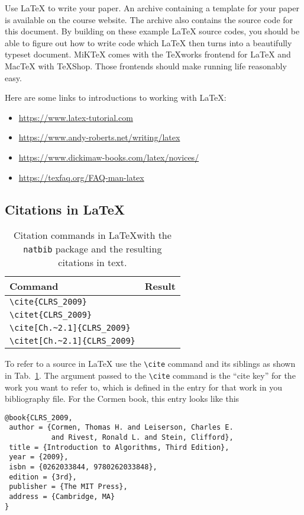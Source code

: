 \documentclass[sigconf, nonacm, natbib, screen, balance=False]{acmart}
\begin{document}
Use \LaTeX{} to write your paper. An archive containing a template for
your paper is available on the course website. The archive also
contains the source code for this document. By building on these example
\LaTeX{} source codes, you should be able to figure out how to write
code which \LaTeX{} then turns into a beautifully typeset document.
MiKTeX comes with the TeXworks frontend for LaTeX and MacTeX with
TeXShop. Those frontends should make running life reasonably easy.

Here are some links to introductions to working with \LaTeX{}:
\begin{itemize}
  \item \url{https://www.latex-tutorial.com}
\item \url{https://www.andy-roberts.net/writing/latex}
\item \url{https://www.dickimaw-books.com/latex/novices/}
\item \url{https://texfaq.org/FAQ-man-latex}
\end{itemize}


\subsection{Citations in \LaTeX}

\begin{table}
  \begin{tabular}{ll}
    \hline
    Command & Result \\\hline
    \verb!\cite{CLRS_2009}! & \cite{CLRS_2009} \\
    \verb!\citet{CLRS_2009}! & \citet{CLRS_2009} \\
    \verb!\cite[Ch.~2.1]{CLRS_2009}! & \cite[Ch.~2.1]{CLRS_2009} \\
    \verb!\citet[Ch.~2.1]{CLRS_2009}! & \citet[Ch.~2.1]{CLRS_2009} \\\hline
    \end{tabular}
  \caption{Citation commands in \LaTeX with the \texttt{natbib} package
  and the resulting citations in text.}\label{tab:cite}
\end{table}


To refer to a source in \LaTeX{} use the \verb!\cite! command and its
siblings as shown in Tab.~\ref{tab:cite}. The argument passed to the
\verb!\cite! command is the ``cite key'' for the work you want to
refer to, which is defined in the entry for that work in you
bibliography file. For the Cormen book, this entry looks like this

\begin{verbatim}
@book{CLRS_2009,
 author = {Cormen, Thomas H. and Leiserson, Charles E. 
           and Rivest, Ronald L. and Stein, Clifford},
 title = {Introduction to Algorithms, Third Edition},
 year = {2009},
 isbn = {0262033844, 9780262033848},
 edition = {3rd},
 publisher = {The MIT Press},
 address = {Cambridge, MA}
} 
\end{verbatim}
\end{document}
